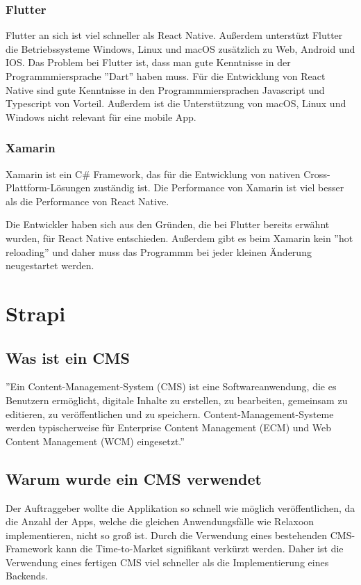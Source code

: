 \subsubsection{Flutter}

Flutter an sich ist viel schneller als React Native.
Außerdem unterstüzt Flutter die Betriebssysteme  Windows, Linux und macOS zusätzlich zu Web, Android und IOS.
\cite{flutter-vs-react-native}
\newline
Das Problem bei Flutter ist, dass man gute Kenntnisse in der Programmmiersprache ''Dart'' haben muss. \cite{flutter-vs-react-native}
Für die Entwicklung von React Native sind gute Kenntnisse in den Programmmiersprachen Javascript und Typescript von Vorteil.
Außerdem ist die Unterstützung von macOS, Linux und Windows nicht relevant für eine mobile App.


\subsubsection{Xamarin}

Xamarin ist ein C\# Framework, das für die Entwicklung von nativen Cross-Plattform-Lösungen zuständig ist.
Die Performance von Xamarin ist viel besser als die Performance von React Native. \cite{xamarin-vs-react-native}

Die Entwickler haben sich aus den Gründen, die bei Flutter bereits erwähnt wurden, für React Native entschieden.
Außerdem gibt es beim Xamarin kein ''hot reloading'' und daher muss das
Programmm bei jeder kleinen Änderung neugestartet werden.\cite{xamarin-vs-react-native}



\section{Strapi}

\subsection{Was ist ein CMS}

''Ein Content-Management-System (CMS) ist eine Softwareanwendung,
die es Benutzern ermöglicht, digitale Inhalte zu erstellen, zu bearbeiten, gemeinsam zu editieren,
zu veröffentlichen und zu speichern. Content-Management-Systeme werden typischerweise für Enterprise
Content Management (ECM) und Web Content Management (WCM) eingesetzt.''
\cite{cms}



\subsection{Warum wurde ein CMS verwendet}
Der Auftraggeber wollte die Applikation so schnell wie möglich veröffentlichen,
da die Anzahl der Apps, welche die gleichen Anwendungsfälle wie Relaxoon implementieren,
nicht so groß ist. Durch die Verwendung eines bestehenden CMS-Framework kann die Time-to-Market signifikant verkürzt werden.
Daher ist die Verwendung eines fertigen CMS viel schneller als
die Implementierung eines Backends.

